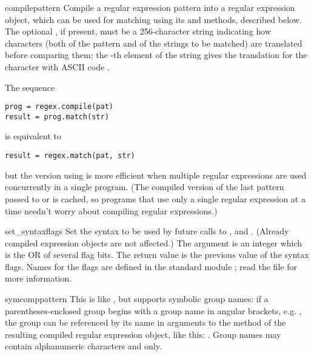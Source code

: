 \begin{funcdesc}{compile}{pattern}
  Compile a regular expression pattern into a regular expression
  object, which can be used for matching using its  and
   methods, described below.  The optional
  , if present, must be a 256-character string
  indicating how characters (both of the pattern and of the strings to
  be matched) are translated before comparing them; the -th
  element of the string gives the translation for the character with
  ASCII code .

  The sequence

\bcode\begin{verbatim}
prog = regex.compile(pat)
result = prog.match(str)
\end{verbatim}\ecode

is equivalent to

\bcode\begin{verbatim}
result = regex.match(pat, str)
\end{verbatim}\ecode

but the version using  is more efficient when multiple
regular expressions are used concurrently in a single program.  (The
compiled version of the last pattern passed to  or
 is cached, so programs that use only a single
regular expression at a time needn't worry about compiling regular
expressions.)
\end{funcdesc}

\begin{funcdesc}{set_syntax}{flags}
  Set the syntax to be used by future calls to ,
   and .  (Already compiled expression objects
  are not affected.)  The argument is an integer which is the OR of
  several flag bits.  The return value is the previous value of
  the syntax flags.  Names for the flags are defined in the standard
  module ; read the file  for
  more information.
\end{funcdesc}

\begin{funcdesc}{symcomp}{pattern}
This is like , but supports symbolic group names: if a
parentheses-enclosed group begins with a group name in angular
brackets, e.g. , the group can
be referenced by its name in arguments to the  method of
the resulting compiled regular expression object, like this:
.  Group names may contain alphanumeric characters
and  only.
\end{funcdesc}

